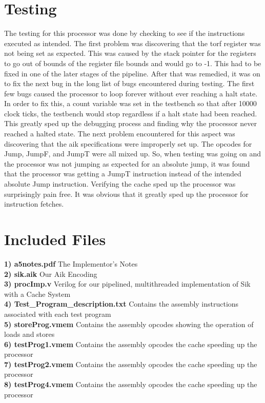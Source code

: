 \documentclass[12pt, twocolumn]{scrartcl}
\begin{document}
\section*{Testing}
The testing for this processor was done by checking to see if the instructions executed as intended. The first problem was discovering that the torf register was not being set as expected. This was caused by the stack pointer for the registers to go out of bounds of the register file bounds and would go to -1. This had to be fixed in one of the later stages of the pipeline. After that was remedied, it was on to fix the next bug in the long list of bugs encountered during testing. 
The first few bugs caused the processor to loop forever without ever reaching a halt state. In order to fix this, a count variable was set in the testbench so that after 10000 clock ticks, the testbench would stop regardless if a halt state had been reached. This greatly sped up the debugging process and finding why the processor never reached a halted state. 
The next problem encountered for this aspect was discovering that the aik specifications were improperly set up. The opcodes for Jump, JumpF, and JumpT were all mixed up. So, when testing was going on and the processor was not jumping as expected for an absolute jump, it was found that the processor was getting a JumpT instruction instead of the intended absolute Jump instruction.
Verifying the cache sped up the processor was surprisingly pain free. It was obvious that it greatly sped up the processor for instruction fetches.

\section*{Included Files}
\textbf {1) a5notes.pdf} The Implementor's Notes \\
\textbf {2) sik.aik} Our Aik Encoding \\
\textbf {3) procImp.v} Verilog for our pipelined, multithreaded implementation of Sik with a Cache System \\
\textbf {4) Test_Program_description.txt} Contains the assembly instructions associated with each test program \\
\textbf {5) storeProg.vmem} Contains the assembly opcodes showing the operation of loads and stores \\
\textbf {6) testProg1.vmem} Contains the assembly opcodes the cache speeding up the processor \\
\textbf {7) testProg2.vmem} Contains the assembly opcodes the cache speeding up the processor \\
\textbf {8) testProg4.vmem} Contains the assembly opcodes the cache speeding up the processor \\
\end{document}
